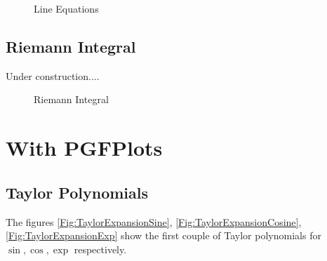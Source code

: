 \begin{figure}[h]
\centering
\caption{Line Equations}
\label{Fig:Line}

\end{figure}

\subsection{Riemann Integral}
Under construction....

\begin{figure}[h]
\centering
\caption{Riemann Integral}
\label{Fig:RiemannIntegral}

\end{figure}









% 

\section{With PGFPlots}

\subsection{Taylor Polynomials}
The figures \ref{Fig:TaylorExpansionSine}, \ref{Fig:TaylorExpansionCosine}, \ref{Fig:TaylorExpansionExp} show the first couple of Taylor polynomials for $\sin, \cos, \exp$ respectively.

